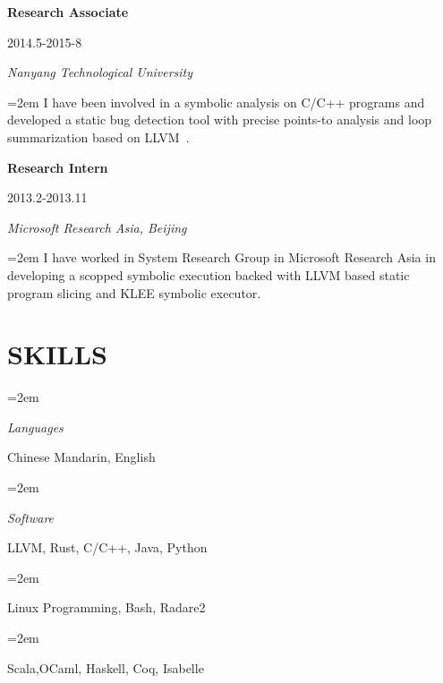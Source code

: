 \documentclass[paper=a4,fontsize=11pt]{article} %
\newlength{\spacebox}
\newcommand{\sepspace}{\vspace*{9pt}}		%
\newcommand{\NewPart}[1]{\section*{\uppercase{#1}}}
\newcommand{\PersonalEntry}[2]{
		\noindent\hangindent=2em\hangafter=0 %
		\parbox{\spacebox}{        %
		\textit{#1}}		       %
		\hspace{1.5em} #2 \par}    %
\newcommand{\SkillsEntry}[2]{      %
		\noindent\hangindent=2em\hangafter=0 %
		\parbox{\spacebox}{        %
		\textit{#1}}			   %
		\hspace{1.5em} #2 \par}    %
\newcommand{\EducationEntry}[4]{
		\noindent \textbf{#1} \hfill      %
			\parbox{12em}{%
			\hfill\color{Black}#2} \par  %
		\noindent \textit{#3} \par        %
		\noindent\hangindent=2em\hangafter=0 \small #4 %
		\normalsize \par}
\begin{document}
\EducationEntry{Research Associate}{2014.5-2015-8}{Nanyang Technological University}{
I have been involved in a symbolic analysis on C/C++ programs and developed a static bug detection tool with precise points-to analysis and loop summarization based on LLVM~\cite{XieLLLC15}.}
\sepspace

\EducationEntry{Research Intern}{2013.2-2013.11}{Microsoft Research Asia, Beijing}{
I have worked in System Research Group in Microsoft Research Asia in developing a scopped symbolic execution backed with LLVM based static program slicing and KLEE symbolic executor.}
\sepspace

\NewPart{Skills}{}

\SkillsEntry{Languages}{Chinese Mandarin, English}
\SkillsEntry{Software}{{LLVM, Rust, C/C++, Java, Python}}
\SkillsEntry{}{Linux Programming, Bash, Radare2}
\SkillsEntry{}{Scala,OCaml, Haskell, Coq, Isabelle}

\pagebreak
\end{document}

